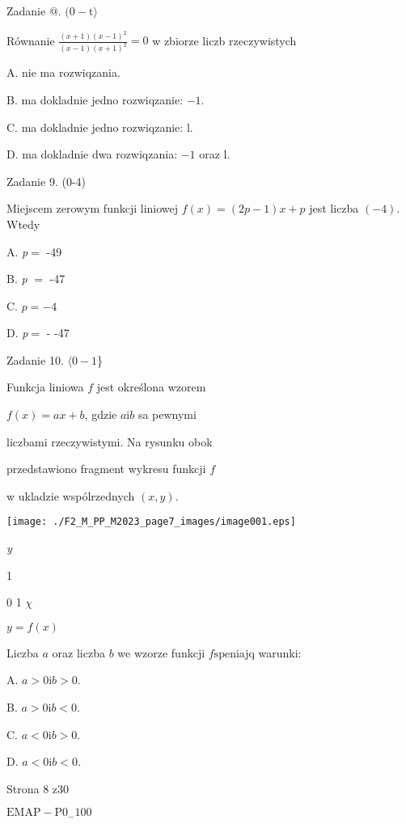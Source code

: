 \documentclass[a4paper,12pt]{article}
\begin{document}
Zadanie @. $(0-\mathrm{t}\rangle$

Równanie $\displaystyle \frac{(x+1)(x-1)^{2}}{(x-1)(x+1)^{2}}=0$ w zbiorze liczb rzeczywistych

A. nie ma rozwiqzania.

B. ma dokladnie jedno rozwiqzanie: $-1.$

C. ma dokladnie jedno rozwiqzanie: l.

D. ma dokladnie dwa rozwiqzania: $-1$ oraz l.

Zadanie 9. (0-4)

Miejscem zerowym funkcji liniowej $f(x)=(2p-1)x+p$ jest liczba $(-4)$. Wtedy

A. {\it p}$=$ -49

B. {\it p} $=$ -47

C. $p=-4$

D. {\it p}$=$ - -47

Zadanie 10. $\langle 0-1$\}

Funkcja liniowa $f$ jest określona wzorem

$f(x)=ax+b$, gdzie $a \mathrm{i} b$ sa pewnymi

liczbami rzeczywistymi. Na rysunku obok

przedstawiono fragment wykresu funkcji $f$

w ukladzie wspólrzednych $(x,y).$
\begin{center}
\texttt{[image: ./F2\_M\_PP\_M2023\_page7\_images/image001.eps]}
\end{center}
{\it y}

1

0 1  $\chi$

$y=f(x)$

Liczba $a$ oraz liczba $b$ we wzorze funkcji $f \mathrm{s}\mathrm{p}\mathrm{e}$niajq warunki:

A. $a>0 \mathrm{i} b>0.$

B. $a>0 \mathrm{i} b<0.$

C. $a<0 \mathrm{i} b>0.$

D. $a<0 \mathrm{i} b<0.$

Strona 8 z30

$\mathrm{E}\mathrm{M}\mathrm{A}\mathrm{P}-\mathrm{P}0_{-}100$
\end{document}
